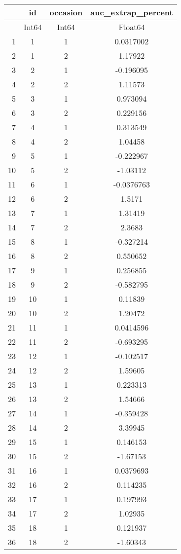 \documentclass[12pt,a4paper]{article}
\begin{document}
\begin{tabular}{r|ccc}
	& id & occasion & auc\_extrap\_percent\\
	\hline
	& Int64 & Int64 & Float64\\
	\hline
	1 & 1 & 1 & 0.0317002 \\
	2 & 1 & 2 & 1.17922 \\
	3 & 2 & 1 & -0.196095 \\
	4 & 2 & 2 & 1.11573 \\
	5 & 3 & 1 & 0.973094 \\
	6 & 3 & 2 & 0.229156 \\
	7 & 4 & 1 & 0.313549 \\
	8 & 4 & 2 & 1.04458 \\
	9 & 5 & 1 & -0.222967 \\
	10 & 5 & 2 & -1.03112 \\
	11 & 6 & 1 & -0.0376763 \\
	12 & 6 & 2 & 1.5171 \\
	13 & 7 & 1 & 1.31419 \\
	14 & 7 & 2 & 2.3683 \\
	15 & 8 & 1 & -0.327214 \\
	16 & 8 & 2 & 0.550652 \\
	17 & 9 & 1 & 0.256855 \\
	18 & 9 & 2 & -0.582795 \\
	19 & 10 & 1 & 0.11839 \\
	20 & 10 & 2 & 1.20472 \\
	21 & 11 & 1 & 0.0414596 \\
	22 & 11 & 2 & -0.693295 \\
	23 & 12 & 1 & -0.102517 \\
	24 & 12 & 2 & 1.59605 \\
	25 & 13 & 1 & 0.223313 \\
	26 & 13 & 2 & 1.54666 \\
	27 & 14 & 1 & -0.359428 \\
	28 & 14 & 2 & 3.39945 \\
	29 & 15 & 1 & 0.146153 \\
	30 & 15 & 2 & -1.67153 \\
	31 & 16 & 1 & 0.0379693 \\
	32 & 16 & 2 & 0.114235 \\
	33 & 17 & 1 & 0.197993 \\
	34 & 17 & 2 & 1.02935 \\
	35 & 18 & 1 & 0.121937 \\
	36 & 18 & 2 & -1.60343 \\

\end{tabular}
\end{document}
